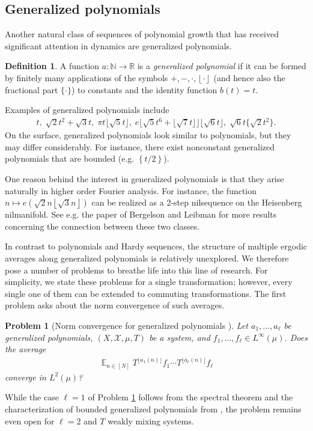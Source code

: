 \documentclass[11pt]{amsart}
\newtheorem{problem}{Problem}
\theoremstyle{definition}
\newtheorem{definition}[lemma]{Definition}
\DeclareMathOperator*{\E}{\mathbb{E}}
\newcommand{\N}{{\mathbb N}}
\newcommand{\R}{{\mathbb R}}
\newcommand{\CX}{{\mathcal X}}
\newcommand{\1}{{\mathbf{1}}}
\newcommand{\floor}[1]{{\left \lfloor #1 \right \rfloor}}
\newcommand{\sfloor}[1]{{\lfloor #1 \rfloor}}
\newcommand{\rem}[1]{\left \{ #1 \right \}}
\begin{document}
    \subsection{Generalized polynomials}\label{SS: generalized polynomials}

Another natural class of sequences of polynomial growth that has received significant attention in dynamics are generalized polynomials.
\begin{definition}
    A function $a:\N\to\R$ is a \emph{generalized polynomial} if it can be formed by finitely many applications of the symbols $+,-,\cdot,\floor{\cdot}$ (and hence also the fractional part $\{\cdot\}$) to constants and the identity function $b(t) =t$.
\end{definition}
Examples of generalized polynomials include
\begin{align*}
    t,\; \sqrt{2}t^2+\sqrt{3}t,\; \pi t\sfloor{\sqrt{5}t},\; e\sfloor{\sqrt{5}t^6 + \sfloor{\sqrt{7}t}}\sfloor{\sqrt{6}t},\; \sqrt{6}t\{\sqrt{2}t^2\}.
\end{align*}
    On the surface, generalized polynomials look similar to polynomials, but they may differ considerably. For instance, there exist nonconstant generalized polynomials that are bounded (e.g. $\rem{t/2}$).

    One reason behind the interest in generalized polynomials is that they arise naturally in higher order Fourier analysis. For instance, the function $n\mapsto e(\sqrt{2}n\floor{\sqrt{3}n})$ can be realized as a 2-step nilsequence on the Heisenberg nilmanifold. See e.g. the paper of Bergelson and Leibman \cite{BL07} for more results concerning the connection between these two classes.

    In contrast to polynomials and Hardy sequences, the structure of multiple ergodic averages along generalized polynomials is relatively unexplored. We therefore pose a number of problems to breathe life into this line of research. For simplicity, we state these problems for a single transformation; however, every single one of them can be extended to commuting transformations.
    The first problem asks about the norm convergence of such averages.
    \begin{problem}[Norm convergence for generalized polynomials {\cite[Problem 14]{Fr16}}]\label{Pr: norm convergence gen polys}
        Let $a_1, \ldots, a_\ell$ be generalized polynomials, $(X, \CX, \mu, T)$ be a system, and $f_1, \ldots, f_\ell\in L^\infty(\mu)$. Does the average
        \begin{align*}
            \E_{n\in[N]}T^{\sfloor{a_1(n)}}f_1\cdots T^{\sfloor{a_\ell(n)}}f_\ell
        \end{align*}
        converge in $L^2(\mu)$?
    \end{problem}
    While the case $\ell=1$ of Problem \ref{Pr: norm convergence gen polys} follows from the spectral theorem and the characterization of bounded generalized polynomials from \cite{BL07}, the problem remains even open for $\ell=2$ and $T$ weakly mixing systems.
    
\end{document}
